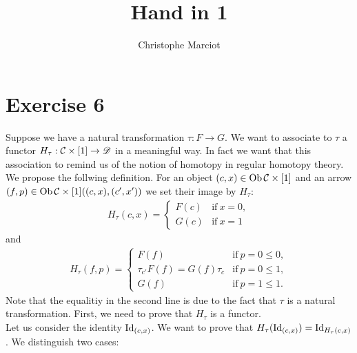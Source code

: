 \documentclass[11pt, a4paper, twoside]{article}
\begin{document}
\title{Hand in 1}
\author{Christophe Marciot}
\maketitle

\section*{Exercise 6}
Suppose we have a natural transformation $\tau:F\rightarrow G$. We want to associate to $\tau$ a functor $H_\tau:\mathcal{C}\times[1]\rightarrow\mathscr D$ in a meaningful way. In fact we want that this association to remind us of the notion of homotopy in regular homotopy theory. \\
We propose the follwing definition. For an object $(c,x)\in \operatorname{Ob}\mathcal{C}\times[1]$ and an arrow $(f,p)\in \operatorname{Ob}\mathcal{C}\times[1]((c,x),(c',x'))$ we set their image by $H_\tau$:
	\begin{align*}
		H_\tau(c,x)=
			\begin{cases}
				F(c) &  \mathrm{if}\ x=0,\\
				G(c) & \mathrm{if}\ x=1
			\end{cases}
	\end{align*}
and 
	\begin{align*}
		H_\tau(f,p)=
			\begin{cases}
				F(f)  & \mathrm{if}\ p=0\leq0,\\
				\tau_{c'}F(f)=G(f)\tau_c & \mathrm{if}\ p=0\leq1,\\
				G(f) & \mathrm{if}\ p=1\leq1.
			\end{cases}
	\end{align*}
Note that the equalitiy in the second line is due to the fact that $\tau$ is a natural transformation. First, we need to prove that $H_\tau$ is a functor.\\
Let us consider the identity $\mathrm{Id}_{(c,x)}$. We want to prove that $H_\tau(\mathrm{Id}_{(c,x)})=\mathrm{Id}_{H_\tau(c,x)}$. We distinguish two cases:\\
	
\end{document}
